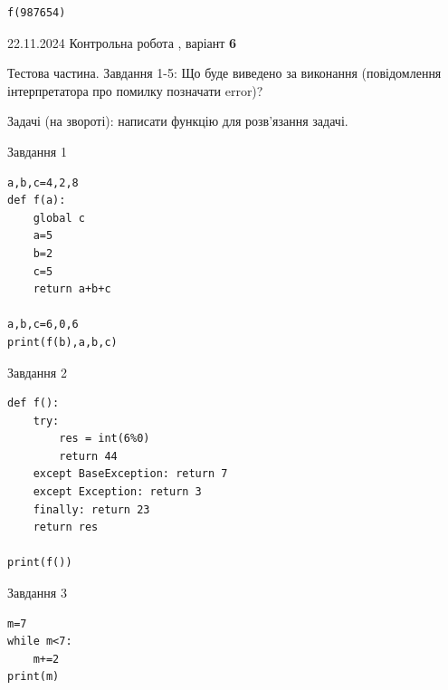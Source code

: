 \documentclass[12pt, ukrainian]{article}
\begin{document}
{{{{{\begin{minipage}[t]{10.7cm}
\begin{verbatim}
f(987654)
\end{verbatim}


\end{minipage}

\newpage

{{22.11.2024 Контрольна робота , варіант  \No \textbf { 6 }\par}}
{

Тестова частина. Завдання 1-5: Що буде виведено за виконання (повідомлення інтерпретатора про помилку позначати error)?

Задачі (на звороті): написати функцію для розв'язання задачі.

\vspace{5mm} \begin{minipage}[t]{8.5cm}
               
{\begin{center}Завдання {1}\end{center}}
\vspace{-6mm}

\begin{verbatim}
a,b,c=4,2,8
def f(a):
    global c
    a=5
    b=2
    c=5
    return a+b+c

a,b,c=6,0,6
print(f(b),a,b,c)
\end{verbatim}


\vspace{5mm}
               
{\begin{center}Завдання {2}\end{center}}
\vspace{-6mm}

\begin{verbatim}
def f():
    try:
        res = int(6%0)
        return 44
    except BaseException: return 7
    except Exception: return 3
    finally: return 23
    return res

print(f())
\end{verbatim}


\vspace{5mm}
               
{\begin{center}Завдання {3}\end{center}}
\vspace{-6mm}

\begin{verbatim}
m=7
while m<7:
    m+=2
print(m)
\end{verbatim}



\end{minipage}}}}}}}
\end{document}
